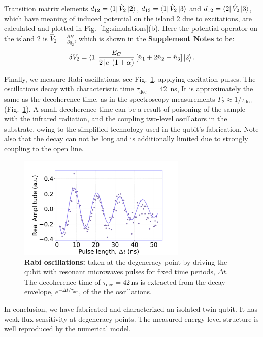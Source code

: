 \documentclass[%
reprint,
superscriptaddress,
bibnotes,
amsmath,
amssymb,
aps,
showkeys,
prb,
]{revtex4-2}
\newcommand{\iunit}[2]{\ensuremath{#1\,\text{#2}}}
\newcommand{\iket}[1]{\ensuremath{\Ket{#1}}}
\newcommand{\ibra}[1]{\ensuremath{\Bra{#1}}}
\newcommand{\iabs}[1]{\ensuremath{\left|#1\right|}}
\begin{document}
Transition matrix elements $d_{12} = \ibra{1}\hat{V}_2\iket{2}$, $d_{13} = \ibra{1}\hat{V}_2\iket{3}$ and $d_{12} = \ibra{2}\hat{V}_2\iket{3}$, which have meaning of induced potential on the island 2 due to excitations, are calculated and plotted in Fig.~\ref{fig:simulations}(b). Here the potential operator on the island 2 is $\hat{V}_2 = \frac{\partial H}{\partial q_2}$, which is shown in the \textbf{Supplement Notes} to be:
\begin{equation}
  \label{eq:dv2}
  \delta     V_2     =\ibra{1}\frac{E_{C}}{2\iabs{e}(1+\alpha)}\left[\hat{n}_1     +     2\hat{n}_2     +
    \hat{n}_3\right]\iket{2}.
\end{equation}


Finally, we measure Rabi oscillations, see Fig.~\ref{fig:rabi}, applying excitation pulses. The oscillations decay with characteristic time $\tau_{\text{dec}}$~=~42~ns, 
It is approximately the same as the decoherence time, as in the spectroscopy measurements $\Gamma_2\approx1/\tau_{\text{dec}}$ (Fig.~\ref{fig:rabi}). 
A small decoherence time can be a result of poisoning of  the sample
with  the infrared  radiation, and  the  coupling two-level  oscillators in  the
substrate, owing to the simplified technology used in the qubit's fabrication. Note also that the decay can not be long and is additionally limited due to strongly coupling to the open line. 

\begin{figure}
  \includegraphics[width=8cm]{fig5}
  \caption{\textbf{Rabi oscillations:}  taken at  the degeneracy point  by driving  the qubit
    with resonant microwaves pulses for fixed time periods, $ \Delta t $.  The decoherence time of
    $   \tau_{\text{dec}}  =   \iunit{42}{ns}  $   is   extracted  from   the  decay   envelope,
    $ e^{-\Delta t/\tau_{\text{dec}}} $, of the the oscillations. \label{fig:rabi}}
\end{figure}

In conclusion, we  have fabricated and  characterized an isolated  twin qubit.  It  has weak
flux  sensitivity at degeneracy  points. The measured energy level structure is well reproduced by the numerical model.


\end{document}

